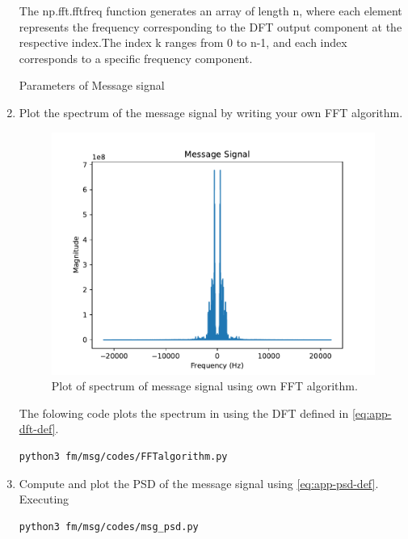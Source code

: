 \begin{enumerate}[label=\arabic*.,ref=\thesection.\theenumi]
The np.fft.fftfreq function generates an array of length n, where each element represents the frequency corresponding to the DFT output component at the respective index.The index k ranges from 0 to n-1, and each index corresponds to a specific frequency component.\\
\begin{table}
  \centering
  
  \caption{Parameters of Message signal}
  \label{tab:4.1}
\end{table}
\item Plot the spectrum of the message signal by writing your own FFT algorithm.\\
	\solution
\begin{figure}[H]
\centering
\includegraphics[width=\columnwidth]{fm/msg/figs/FFTalgorithm.pdf}
\caption{Plot of spectrum of message signal using own FFT algorithm.}
\label{fig:FFTo}
\end{figure}
The folowing code plots the spectrum in  using the DFT defined in  \eqref{eq:app-dft-def}.
\begin{lstlisting}
python3 fm/msg/codes/FFTalgorithm.py
\end{lstlisting}
\item Compute and plot the PSD of the message signal using 
\eqref{eq:app-psd-def}.
\\
	\solution
Executing	
\begin{lstlisting}
python3 fm/msg/codes/msg_psd.py
\end{lstlisting}


\end{enumerate}
